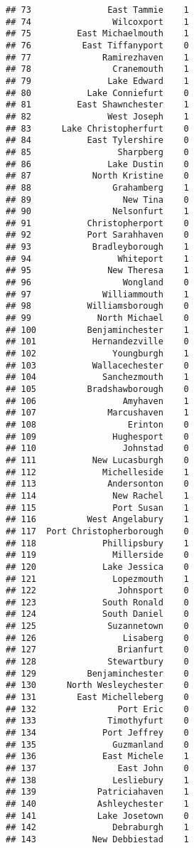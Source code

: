 \documentclass[
]{article}
\begin{document}
\begin{verbatim}
## 73               East Tammie    1
## 74                Wilcoxport    1
## 75         East Michaelmouth    1
## 76          East Tiffanyport    0
## 77              Ramirezhaven    1
## 78                Cranemouth    1
## 79               Lake Edward    1
## 80           Lake Conniefurt    0
## 81         East Shawnchester    1
## 82               West Joseph    1
## 83      Lake Christopherfurt    0
## 84           East Tylershire    0
## 85                 Sharpberg    0
## 86               Lake Dustin    0
## 87            North Kristine    0
## 88                Grahamberg    1
## 89                  New Tina    0
## 90                Nelsonfurt    1
## 91           Christopherport    0
## 92           Port Sarahhaven    0
## 93            Bradleyborough    1
## 94                 Whiteport    1
## 95               New Theresa    1
## 96                  Wongland    0
## 97              Williammouth    1
## 98           Williamsborough    0
## 99             North Michael    0
## 100          Benjaminchester    1
## 101           Hernandezville    0
## 102               Youngburgh    1
## 103           Wallacechester    0
## 104             Sanchezmouth    1
## 105          Bradshawborough    0
## 106                 Amyhaven    1
## 107              Marcushaven    1
## 108                  Erinton    0
## 109               Hughesport    0
## 110                 Johnstad    0
## 111           New Lucasburgh    0
## 112             Michelleside    1
## 113              Andersonton    0
## 114               New Rachel    1
## 115               Port Susan    1
## 116          West Angelabury    1
## 117  Port Christopherborough    0
## 118             Phillipsbury    1
## 119               Millerside    0
## 120             Lake Jessica    0
## 121               Lopezmouth    1
## 122                Johnsport    0
## 123             South Ronald    0
## 124             South Daniel    0
## 125              Suzannetown    0
## 126                 Lisaberg    0
## 127                Brianfurt    0
## 128              Stewartbury    0
## 129          Benjaminchester    0
## 130      North Wesleychester    0
## 131        East Michelleberg    0
## 132                Port Eric    0
## 133              Timothyfurt    0
## 134             Port Jeffrey    0
## 135               Guzmanland    0
## 136             East Michele    1
## 137                East John    0
## 138               Lesliebury    1
## 139            Patriciahaven    1
## 140            Ashleychester    1
## 141            Lake Josetown    0
## 142               Debraburgh    1
## 143           New Debbiestad    1

\end{verbatim}
\end{document}

